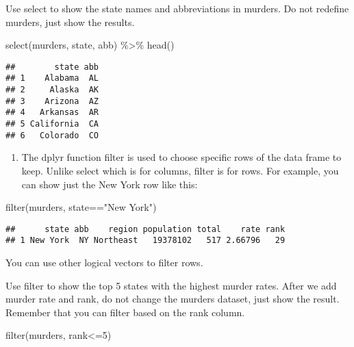 \documentclass[
]{article}
\newenvironment{Shaded}{\begin{snugshade}}{\end{snugshade}}
\newcommand{\DecValTok}[1]{\textcolor[rgb]{0.00,0.00,0.81}{#1}}
\newcommand{\FunctionTok}[1]{\textcolor[rgb]{0.00,0.00,0.00}{#1}}
\newcommand{\NormalTok}[1]{#1}
\newcommand{\SpecialCharTok}[1]{\textcolor[rgb]{0.00,0.00,0.00}{#1}}
\newcommand{\StringTok}[1]{\textcolor[rgb]{0.31,0.60,0.02}{#1}}
\providecommand{\tightlist}{%
  \setlength{\itemsep}{0pt}\setlength{\parskip}{0pt}}
\begin{document}
Use select to show the state names and abbreviations in murders. Do not
redefine murders, just show the results.

\begin{Shaded}
\begin{Highlighting}[]
\FunctionTok{select}\NormalTok{(murders, state, abb) }\SpecialCharTok{\%\textgreater{}\%} \FunctionTok{head}\NormalTok{()}
\end{Highlighting}
\end{Shaded}

\begin{verbatim}
##        state abb
## 1    Alabama  AL
## 2     Alaska  AK
## 3    Arizona  AZ
## 4   Arkansas  AR
## 5 California  CA
## 6   Colorado  CO
\end{verbatim}

\begin{enumerate}
\def\labelenumi{\arabic{enumi}.}
\setcounter{enumi}{3}
\tightlist
\item
  The dplyr function filter is used to choose specific rows of the data
  frame to keep. Unlike select which is for columns, filter is for rows.
  For example, you can show just the New York row like this:
\end{enumerate}

\begin{Shaded}
\begin{Highlighting}[]
\FunctionTok{filter}\NormalTok{(murders, state}\SpecialCharTok{==}\StringTok{"New York"}\NormalTok{)}
\end{Highlighting}
\end{Shaded}

\begin{verbatim}
##      state abb    region population total    rate rank
## 1 New York  NY Northeast   19378102   517 2.66796   29
\end{verbatim}

You can use other logical vectors to filter rows.

Use filter to show the top 5 states with the highest murder rates. After
we add murder rate and rank, do not change the murders dataset, just
show the result. Remember that you can filter based on the rank column.

\begin{Shaded}
\begin{Highlighting}[]
\FunctionTok{filter}\NormalTok{(murders, rank}\SpecialCharTok{\textless{}=}\DecValTok{5}\NormalTok{) }
\end{Highlighting}
\end{Shaded}
\end{document}
